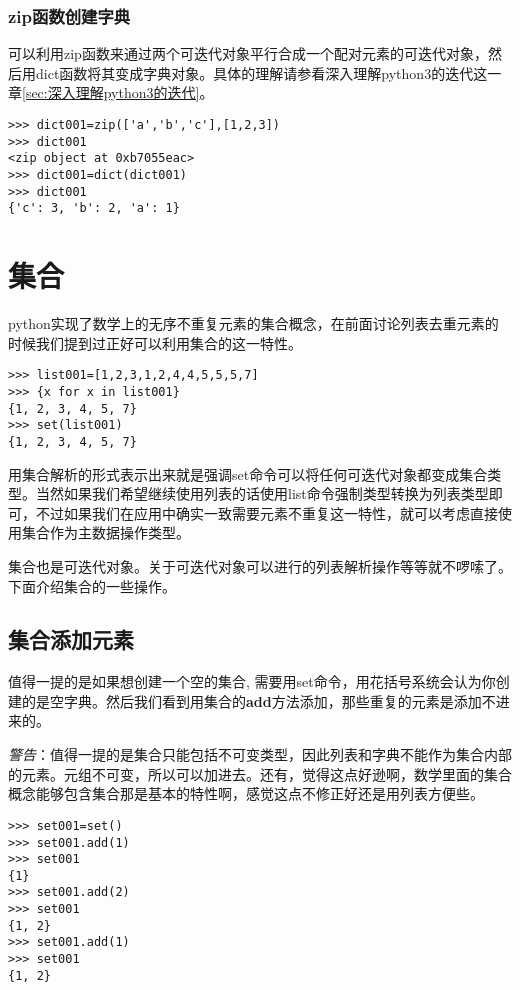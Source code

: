 \documentclass[12pt,oneside]{book}
\begin{document}
\begin{common-format}
\subsubsection{zip函数创建字典}
可以利用zip函数来通过两个可迭代对象平行合成一个配对元素的可迭代对象，然后用dict函数将其变成字典对象。具体的理解请参看深入理解python3的迭代这一章\ref{sec:深入理解python3的迭代}。
\begin{Verbatim}
>>> dict001=zip(['a','b','c'],[1,2,3])
>>> dict001
<zip object at 0xb7055eac>
>>> dict001=dict(dict001)
>>> dict001
{'c': 3, 'b': 2, 'a': 1}
\end{Verbatim}




\section{集合}
\label{sec:集合}
python实现了数学上的无序不重复元素的集合概念，在前面讨论列表去重元素的时候我们提到过正好可以利用集合的这一特性。

\begin{Verbatim}
>>> list001=[1,2,3,1,2,4,4,5,5,5,7]
>>> {x for x in list001}
{1, 2, 3, 4, 5, 7}
>>> set(list001)
{1, 2, 3, 4, 5, 7}
\end{Verbatim}
用集合解析的形式表示出来就是强调set命令可以将任何可迭代对象都变成集合类型。当然如果我们希望继续使用列表的话使用list命令强制类型转换为列表类型即可，不过如果我们在应用中确实一致需要元素不重复这一特性，就可以考虑直接使用集合作为主数据操作类型。

集合也是可迭代对象。关于可迭代对象可以进行的列表解析操作等等就不啰嗦了。下面介绍集合的一些操作。

\subsection{集合添加元素}
值得一提的是如果想创建一个空的集合, 需要用set命令，用花括号{}系统会认为你创建的是空字典。然后我们看到用集合的\textbf{add}方法添加，那些重复的元素是添加不进来的。

\emph{警告}：值得一提的是集合只能包括不可变类型，因此列表和字典不能作为集合内部的元素。元组不可变，所以可以加进去。还有，觉得这点好逊啊，数学里面的集合概念能够包含集合那是基本的特性啊，感觉这点不修正好还是用列表方便些。

\begin{Verbatim}
>>> set001=set()
>>> set001.add(1)
>>> set001
{1}
>>> set001.add(2)
>>> set001
{1, 2}
>>> set001.add(1)
>>> set001
{1, 2}
\end{Verbatim}


\end{common-format}
\end{document}
